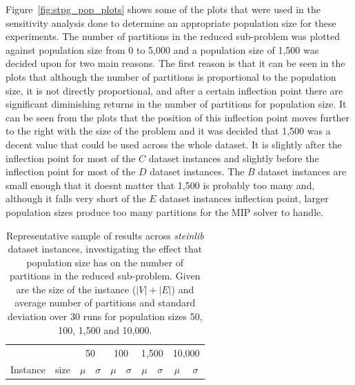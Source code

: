\documentclass[journal]{IEEEtran}
\begin{document}
Figure~\ref{fig:stpg_pop_plots} shows some of the plots that were used in the sensitivity analysis done to determine an appropriate population size for these experiments. The number of partitions in the reduced sub-problem was plotted against population size from 0 to 5,000 and a population size of 1,500 was decided upon for two main reasons. The first reason is that it can be seen in the plots that although the number of partitions is proportional to the population size, it is not directly proportional, and after a certain inflection point there are significant diminishing returns in the number of partitions for population size. It can be seen from the plots that the position of this inflection point moves further to the right with the size of the problem and it was decided that 1,500 was a decent value that could be used across the whole dataset. It is slightly after the inflection point for most of the \(C\) dataset instances and slightly before the inflection point for most of the \(D\) dataset instances. The \(B\) dataset instances are small enough that it doesnt matter that 1,500 is probably too many and, although it falls very short of the \(E\) dataset instances inflection point, larger population sizes produce too many partitions for the MIP solver to handle.
\begin{table}[h]
\centering
\caption[Size of reduced sub-problem results]{Representative sample of results across \emph{steinlib} dataset instances, investigating the effect that population size has on the number of partitions in the reduced sub-problem. Given are the size of the instance (\(|V|+|E|\)) and average number of partitions and standard deviation over 30 runs for population sizes 50, 100, 1,500 and 10,000.}\label{tab:stpg:pop:trunc} 
\begin{adjustbox}{width=0.45\textwidth}
\begin{tabular}{lrrrrrrrrr} \toprule
 &  & \multicolumn{2}{c}{50} & \multicolumn{2}{c}{100} & \multicolumn{2}{c}{1,500} & \multicolumn{2}{c}{10,000}\\
\cmidrule(lr){3-4} \cmidrule(lr){5-6} \cmidrule(lr){7-8} \cmidrule(lr){9-10} 
Instance & size & \multicolumn{1}{c}{\(\mu\)}&\multicolumn{1}{c}{\(\sigma\)} & \multicolumn{1}{c}{\(\mu\)}&\multicolumn{1}{c}{\(\sigma\)}& \multicolumn{1}{c}{\(\mu\)}&\multicolumn{1}{c}{\(\sigma\)} & \multicolumn{1}{c}{\(\mu\)}&\multicolumn{1}{c}{\(\sigma\)}\\ \midrule
%

%
\bottomrule
\end{tabular}
\end{adjustbox}
\end{table}
\end{document}

